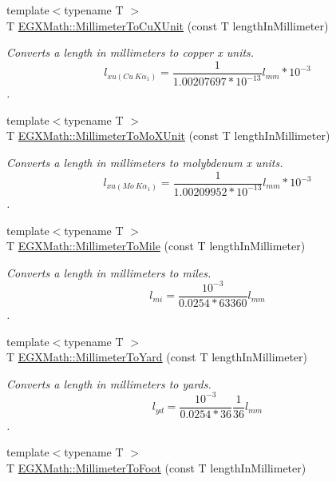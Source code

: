 \begin{DoxyCompactItemize}
{\footnotesize template$<$typename T $>$ }\\T \mbox{\hyperlink{group___e_g_x_math-_conversions-_length_conversions-_s_i-_millimeter-_non-_s_i_gaa9a94e1f42047955530f673047c4370b}{E\+G\+X\+Math\+::\+Millimeter\+To\+Cu\+X\+Unit}} (const T length\+In\+Millimeter)
\begin{DoxyCompactList}\small\item\em Converts a length in millimeters to copper x units. \[ l_{xu(Cu\ K\alpha_1)}= \frac{1}{1.00207697*10^{-13}} l_{mm} * 10^{-3}\]. \end{DoxyCompactList}\item 
{\footnotesize template$<$typename T $>$ }\\T \mbox{\hyperlink{group___e_g_x_math-_conversions-_length_conversions-_s_i-_millimeter-_non-_s_i_ga1f0be98bc702f46a69579b27e05a2439}{E\+G\+X\+Math\+::\+Millimeter\+To\+Mo\+X\+Unit}} (const T length\+In\+Millimeter)
\begin{DoxyCompactList}\small\item\em Converts a length in millimeters to molybdenum x units. \[ l_{xu(Mo\ K\alpha_1)}=\frac{1}{1.00209952*10^{-13}} l_{mm} * 10^{-3}\]. \end{DoxyCompactList}\item 
{\footnotesize template$<$typename T $>$ }\\T \mbox{\hyperlink{group___e_g_x_math-_conversions-_length_conversions-_s_i-_millimeter-_imperial_ga8a11dcd8f7866189b30e01d65e003e2d}{E\+G\+X\+Math\+::\+Millimeter\+To\+Mile}} (const T length\+In\+Millimeter)
\begin{DoxyCompactList}\small\item\em Converts a length in millimeters to miles. \[ l_{mi}=\frac{10^{-3}}{0.0254 * 63360} l_{mm} \]. \end{DoxyCompactList}\item 
{\footnotesize template$<$typename T $>$ }\\T \mbox{\hyperlink{group___e_g_x_math-_conversions-_length_conversions-_s_i-_millimeter-_imperial_gae1b144c2bc56f6591e0ee9b37f0653fa}{E\+G\+X\+Math\+::\+Millimeter\+To\+Yard}} (const T length\+In\+Millimeter)
\begin{DoxyCompactList}\small\item\em Converts a length in millimeters to yards. \[ l_{yd}= \frac{10^{-3}}{0.0254 * 36} \frac{1}{36} l_{mm} \]. \end{DoxyCompactList}\item 
{\footnotesize template$<$typename T $>$ }\\T \mbox{\hyperlink{group___e_g_x_math-_conversions-_length_conversions-_s_i-_millimeter-_imperial_ga96513545d32f8e86044a3a3551840023}{E\+G\+X\+Math\+::\+Millimeter\+To\+Foot}} (const T length\+In\+Millimeter)

\end{DoxyCompactItemize}
